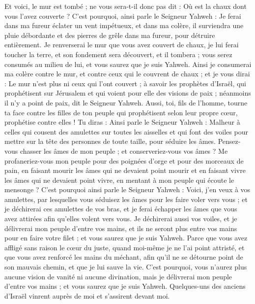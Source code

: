 \begin{multicols}{2}
Et voici, le mur est tombé ; ne vous sera-t-il donc pas dit : Où est la chaux dont vous l'avez couverte ?
C'est pourquoi, ainsi parle le Seigneur Yahweh : Je ferai dans ma fureur éclater un vent impétueux, et dans ma colère, il surviendra une pluie débordante et des pierres de grêle dans ma fureur, pour détruire entièrement.
Je renverserai le mur que vous avez couvert de chaux, je lui ferai toucher la terre, et son fondement sera découvert, et il tombera ; vous serez consumés au milieu de lui, et vous saurez que je suis Yahweh.
Ainsi je consumerai ma colère contre le mur, et contre ceux qui le couvrent de chaux ; et je vous dirai : Le mur n'est plus ni ceux qui l'ont couvert ;
à savoir les prophètes d'Israël, qui prophétisent sur Jérusalem et qui voient pour elle des visions de paix ; néanmoins il n'y a point de paix, dit le Seigneur Yahweh.
Aussi, toi, fils de l’homme, tourne ta face contre les filles de ton peuple qui prophétisent selon leur propre cœur, prophétise contre elles !
Tu diras : Ainsi parle le Seigneur Yahweh : Malheur à celles qui cousent des amulettes sur toutes les aisselles et qui font des voiles pour mettre sur la tête des personnes de toute taille, pour séduire les âmes. Pensez-vous chasser les âmes de mon peuple ; et conserveriez-vous vos âmes ?
Me profaneriez-vous mon peuple pour des poignées d'orge et pour des morceaux de pain, en faisant mourir les âmes qui ne devaient point mourir et en faisant vivre les âmes qui ne devaient point vivre, en mentant à mon peuple qui écoute le mensonge ?
C'est pourquoi ainsi parle le Seigneur Yahweh : Voici, j'en veux à vos amulettes, par lesquelles vous séduisez les âmes pour les faire voler vers vous ; et je déchirerai ces amulettes de vos bras, et je ferai échapper les âmes que vous avez attirées afin qu'elles volent vers vous.
Je déchirerai aussi vos voiles, et je délivrerai mon peuple d'entre vos mains, et ils ne seront plus entre vos mains pour en faire votre filet ; et vous saurez que je suis Yahweh.
Parce que vous avez affligé sans raison le cœur du juste, quand moi-même je ne l’ai point attristé, et que vous avez renforcé les mains du méchant, afin qu'il ne se détourne point de son mauvais chemin, et que je lui sauve la vie.
C'est pourquoi, vous n'aurez plus aucune vision de vanité ni aucune divination, mais je délivrerai mon peuple d'entre vos mains ; et vous saurez que je suis Yahweh.
\VerseOne{}Quelques-uns des anciens d'Israël vinrent auprès de moi et s'assirent devant moi.

\end{multicols}
